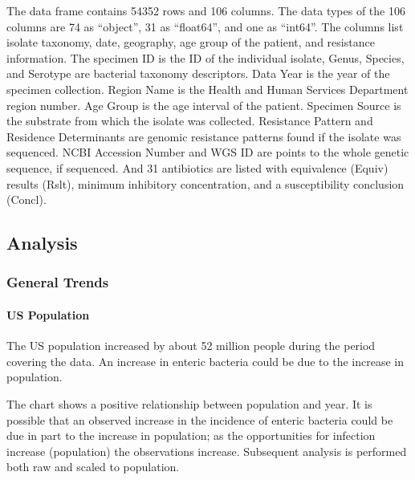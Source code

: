 \documentclass[11pt]{article}
\begin{document}
    The data frame contains 54352 rows and 106 columns. The data types of
the 106 columns are 74 as ``object'', 31 as ``float64'', and one as
``int64''. The columns list isolate taxonomy, date, geography, age group
of the patient, and resistance information. The specimen ID is the ID of
the individual isolate, Genus, Species, and Serotype are bacterial
taxonomy descriptors. Data Year is the year of the specimen collection.
Region Name is the Health and Human Services Department region number.
Age Group is the age interval of the patient. Specimen Source is the
substrate from which the isolate was collected. Resistance Pattern and
Residence Determinants are genomic resistance patterns found if the
isolate was sequenced. NCBI Accession Number and WGS ID are points to
the whole genetic sequence, if sequenced. And 31 antibiotics are listed
with equivalence (Equiv) results (Rslt), minimum inhibitory
concentration, and a susceptibility conclusion (Concl).

    \hypertarget{analysis}{%
\subsection{Analysis}\label{analysis}}

    \hypertarget{general-trends}{%
\subsubsection{General Trends}\label{general-trends}}

    \hypertarget{us-population}{%
\paragraph{US Population}\label{us-population}}

    The US population increased by about 52 million people during the period
covering the data. An increase in enteric bacteria could be due to the
increase in population.

The chart shows a positive relationship between population and year. It
is possible that an observed increase in the incidence of enteric
bacteria could be due in part to the increase in population; as the
opportunities for infection increase (population) the observations
increase. Subsequent analysis is performed both raw and scaled to
population.
\end{document}
